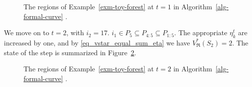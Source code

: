 \documentclass[
  11pt,
  a4paper,
]{article}
\theoremstyle{plain}
\theoremstyle{definition}
\theoremstyle{plain}
\theoremstyle{definition}
\theoremstyle{plain}
\theoremstyle{remark}
\begin{document}
\begin{figure}


\caption{\label{fig-t1}The regions of Example~\ref{exm-toy-forest} at
\(t=1\) in  Algorithm~\ref{alg-formal-curve} .}

\end{figure}%

We move on to \(t=2\), with \(i_2=17\).
\(i_1\in P_5\subseteq P_{4:5}\subseteq P_{1:5}\). The appropriate
\(\eta_k^t\) are increased by one, and by \eqref{eq_vstar_equal_sum_eta}
we have \(V^*_{\mathfrak{R}}(S_2)=2\). The state of the step is
summarized in Figure~\ref{fig-t2}.

\begin{figure}


\caption{\label{fig-t2}The regions of Example~\ref{exm-toy-forest} at
\(t=2\) in  Algorithm~\ref{alg-formal-curve} .}

\end{figure}%
\end{document}
